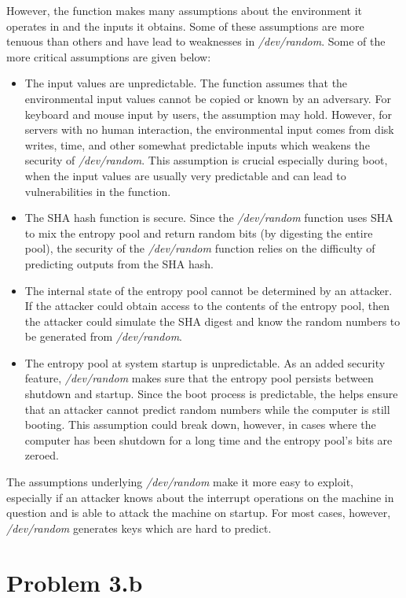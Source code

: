 \documentclass[psamsfonts]{amsart}
\begin{document}
However, the function makes many assumptions about the environment it operates in and the inputs it obtains. Some of these assumptions are more tenuous than others and have lead to weaknesses in \emph{/dev/random}. Some of the more critical assumptions are given below:
\begin{itemize}
  \item The input values are unpredictable. The function assumes that the environmental input values cannot be copied or known by an adversary. For keyboard and mouse input by users, the assumption may hold. However, for servers with no human interaction, the environmental input comes from disk writes, time, and other somewhat predictable inputs which weakens the security of \emph{/dev/random}. This assumption is crucial especially during boot, when the input values are usually very predictable and can lead to vulnerabilities in the function.
  \item The SHA hash function is secure. Since the \emph{/dev/random} function uses SHA to mix the entropy pool and return random bits (by digesting the entire pool), the security of the \emph{/dev/random} function relies on the difficulty of predicting outputs from the SHA hash.
  \item The internal state of the entropy pool cannot be determined by an attacker. If the attacker could obtain access to the contents of the entropy pool, then the attacker could simulate the SHA digest and know the random numbers to be generated from \emph{/dev/random}.
  \item The entropy pool at system startup is unpredictable. As an added security feature, \emph{/dev/random} makes sure that the entropy pool persists between shutdown and startup. Since the boot process is predictable, the helps ensure that an attacker cannot predict random numbers while the computer is still booting. This assumption could break down, however, in cases where the computer has been shutdown for a long time and the entropy pool's bits are zeroed.
\end{itemize}

The assumptions underlying \emph{/dev/random} make it more easy to exploit, especially if an attacker knows about the interrupt operations on the machine in question and is able to attack the machine on startup. For most cases, however, \emph{/dev/random} generates keys which are hard to predict.

\section{Problem 3.b}
\end{document}

